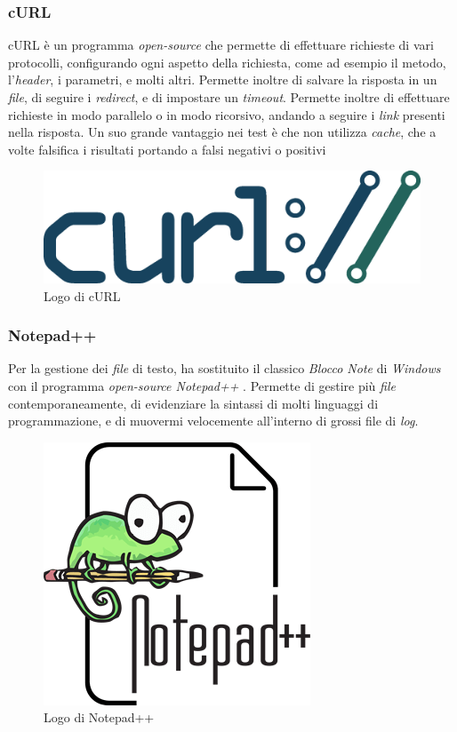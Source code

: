 \subsubsection{cURL}

cURL è un programma \emph{open-source} che permette di effettuare richieste di vari protocolli, configurando ogni aspetto della richiesta, come ad esempio il metodo, l'\emph{header}, i parametri, e molti altri. Permette inoltre di salvare la risposta in un \emph{file}, di seguire i \emph{redirect}, e di impostare un \emph{timeout}. Permette inoltre di effettuare richieste in modo parallelo o in modo ricorsivo, andando a seguire i \emph{link} presenti nella risposta. Un suo grande vantaggio nei test è che non utilizza \emph{cache}, che a volte falsifica i risultati portando a falsi negativi o positivi

\begin{figure}[!htbp]
    \centering
    \includegraphics[width=0.5\linewidth]{images/loghi/curl.png}
    \caption{Logo di cURL}
    \label{fig:curl-logo}
\end{figure}

\subsubsection{Notepad++}

Per la gestione dei \emph{file} di testo, ha sostituito il classico \emph{Blocco Note} di \emph{Windows} con il programma \emph{open-source Notepad++} . Permette di gestire più \emph{file} contemporaneamente, di evidenziare la sintassi di molti linguaggi di programmazione, e di muovermi velocemente all'interno di grossi file di \emph{log}.

\begin{figure}[!htbp]
    \centering
    \includegraphics[scale=0.3]{images/loghi/notepadpp.png}
    \caption{Logo di Notepad++}
    \label{fig:notepadpp-logo}
\end{figure}